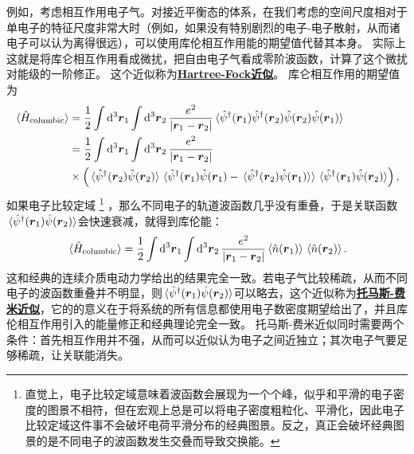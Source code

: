 \documentclass[hyperref, UTF8, a4paper]{ctexart}
\newcommand*{\concept}[1]{\underline{\textbf{#1}}}
\begin{document}
例如，考虑相互作用电子气。对接近平衡态的体系，在我们考虑的空间尺度相对于单电子的特征尺度非常大时（例如，如果没有特别剧烈的电子-电子散射，从而诸电子可以认为离得很远），可以使用库伦相互作用能的期望值代替其本身。
实际上这就是将库仑相互作用看成微扰，把自由电子气看成零阶波函数，计算了这个微扰对能级的一阶修正。
这个近似称为\concept{Hartree-Fock近似}。
库仑相互作用的期望值为
\[
    \begin{aligned}
        \expval*{\hat{H}_\text{columbic}} &= \frac{1}{2} \int \dd[3]{\vb*{r}_1} \int \dd[3]{\vb*{r}_2} \frac{e^2}{\abs{\vb*{r}_1 - \vb*{r}_2}} \expval*{\hat{\psi}^\dagger (\vb*{r}_1) \hat{\psi}^\dagger(\vb*{r}_2) \hat{\psi} (\vb*{r}_2) \hat{\psi}(\vb*{r}_1)} \\
        &= \frac{1}{2} \int \dd[3]{\vb*{r}_1} \int \dd[3]{\vb*{r}_2} \frac{e^2}{\abs{\vb*{r}_1 - \vb*{r}_2}} \\
        & \times \left( \expval*{\hat{\psi}^\dagger(\vb*{r}_2) \hat{\psi} (\vb*{r}_2)} \expval*{\hat{\psi}^\dagger(\vb*{r}_1) \hat{\psi} (\vb*{r}_1) - \expval*{\hat{\psi}^\dagger(\vb*{r}_2) \hat{\psi} (\vb*{r}_1)}} \expval*{\hat{\psi}^\dagger(\vb*{r}_1) \hat{\psi} (\vb*{r}_2)} \right),
    \end{aligned}
\]
如果电子比较定域%
\footnote{直觉上，电子比较定域意味着波函数会展现为一个个峰，似乎和平滑的电子密度的图景不相符，但在宏观上总是可以将电子密度粗粒化、平滑化，因此电子比较定域这件事不会破坏电荷平滑分布的经典图景。反之，真正会破坏经典图景的是不同电子的波函数发生交叠而导致交换能。}%
，那么不同电子的轨道波函数几乎没有重叠，于是关联函数$\expval*{\hat{\psi}^\dagger(\vb*{r}_1) \hat{\psi}(\vb*{r}_2)}$会快速衰减，就得到库伦能：
\begin{equation}
    \expval*{\hat{H}_\text{columbic}} = \frac{1}{2} \int \dd[3]{\vb*{r}_1} \int \dd[3]{\vb*{r}_2} \frac{e^2}{\abs{\vb*{r}_1 - \vb*{r}_2}} \expval*{\hat{n} (\vb*{r}_1)} \expval*{\hat{n} (\vb*{r}_2)}.
\end{equation}
这和经典的连续介质电动力学给出的结果完全一致。若电子气比较稀疏，从而不同电子的波函数重叠并不明显，则$\expval*{\hat{\psi}^\dagger(\vb*{r}_1) \hat{\psi}(\vb*{r}_2)}$可以略去，这个近似称为\concept{托马斯-费米近似}，它的的意义在于将系统的所有信息都使用电子数密度期望给出了，并且库伦相互作用引入的能量修正和经典理论完全一致。
托马斯-费米近似同时需要两个条件：首先相互作用并不强，从而可以近似认为电子之间近独立；其次电子气要足够稀疏，让关联能消失。
\end{document}
